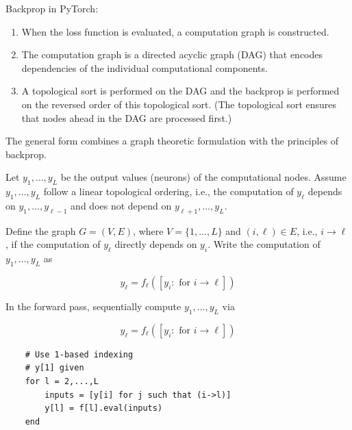 \begin{definition}
    Backprop in PyTorch:

    \begin{enumerate}
        \item When the loss function is evaluated, a computation graph is constructed.
        \item The computation graph is a directed acyclic graph (DAG) that encodes dependencies of the individual computational components.
        \item A topological sort is performed on the DAG and the backprop is performed on the reversed order of this topological sort. (The topological sort ensures that nodes ahead in the DAG are processed first.)
    \end{enumerate}

    The general form combines a graph theoretic formulation with the principles of backprop.
\end{definition}

\begin{definition}
    Let $y_{1}, \ldots, y_{L}$ be the output values (neurons) of the computational nodes. Assume $y_{1}, \ldots, y_{L}$ follow a linear topological ordering, i.e., the computation of $y_{\ell}$ depends on $y_{1}, \ldots, y_{\ell-1}$ and does not depend on $y_{\ell+1}, \ldots, y_{L}$.

    Define the graph $G=(V, E)$, where $V=\{1, \ldots, L\}$ and $(i, \ell) \in E$, i.e., $i \rightarrow \ell$, if the computation of $y_{\ell}$ directly depends on $y_{i}$. Write the computation of $y_{1}, \ldots, y_{L}$ as

    $$
    y_{\ell}=f_{\ell}\left(\left[y_{i}: \text { for } i \rightarrow \ell\right]\right)
    $$
\end{definition}

\begin{definition}
    In the forward pass, sequentially compute $y_{1}, \ldots, y_{L}$ via

    $$
    y_{\ell}=f_{\ell}\left(\left[y_{i}: \text { for } i \rightarrow \ell\right]\right)
    $$

    \begin{verbatim}
    # Use 1-based indexing
    # y[1] given
    for l = 2,...,L
        inputs = [y[i] for j such that (i->l)]
        y[l] = f[l].eval(inputs)
    end
    \end{verbatim}
\end{definition}

